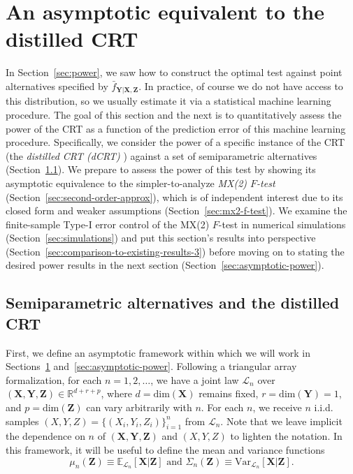\documentclass[12pt]{article}
\theoremstyle{definition}
\theoremstyle{remark}
\newcommand{\prx}{\bm X}
\newcommand{\srx}{X}
\newcommand{\prz}{\bm Z}
\newcommand{\srz}{Z}
\newcommand{\pry}{{\bm Y}}
\newcommand{\sry}{Y}
\begin{document}
\section{An asymptotic equivalent to the distilled CRT} \label{sec:weakening}

In Section~\ref{sec:power}, we saw how to construct the optimal test against point alternatives specified by $\bar f_{\pry|\prx,\prz}$. In practice, of course we do not have access to this distribution, so we usually estimate it via a statistical machine learning procedure. The goal of this section and the next is to quantitatively assess the power of the CRT as a function of the prediction error of this machine learning procedure. Specifically, we consider  the power of a specific instance of the CRT (the \textit{distilled CRT (dCRT)} \cite{Liu2020})  against a set of semiparametric alternatives (Section~\ref{sec:asymptotic-setup}). We prepare to assess the power of this test by showing its asymptotic equivalence to the simpler-to-analyze \textit{MX(2) $F$-test} (Section~\ref{sec:second-order-approx}), which is of independent interest due to its closed form and weaker assumptions (Section~\ref{sec:mx2-f-test}). We examine the finite-sample Type-I error control of the MX(2) $F$-test in numerical simulations (Section~\ref{sec:simulations}) and put this section's results into perspective (Section~\ref{sec:comparison-to-existing-results-3}) before moving on to stating the desired power results in the next section (Section~\ref{sec:asymptotic-power}).


\subsection{Semiparametric alternatives and the distilled CRT} \label{sec:asymptotic-setup}

First, we define an asymptotic framework within which we will work in Sections~\ref{sec:weakening} and~\ref{sec:asymptotic-power}. Following a triangular array formalization, for each $n = 1, 2, \dots$, we have a joint law $\mathcal L_n$ over $(\prx, \pry, \prz) \in \mathbb R^{d + r + p}$, where $d = \text{dim}(\prx)$ remains fixed, $r = \text{dim}(\pry) = 1$, and $p = \text{dim}(\prz)$ can vary arbitrarily with $n$. For each $n$, we receive $n$ i.i.d. samples $(\srx, \sry, \srz) = \{(\srx_i, \sry_i, \srz_i)\}_{i = 1}^n$ from $\mathcal L_n$. Note that we leave implicit the dependence on $n$ of $(\prx,\pry,\prz)$ and $(X,Y,Z)$ to lighten the notation. In this framework, it will be useful to define the mean and variance functions
\begin{equation}
	\mu_n(\prz) \equiv \mathbb E_{\mathcal L_n}[\prx|\prz]  \text{ and } \Sigma_n(\prz) \equiv \text{Var}_{\mathcal L_n}[\prx|\prz].
	\label{eq:conditional-mean-variance}
\end{equation}
\end{document}
